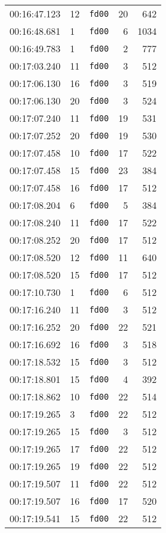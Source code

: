 \documentclass{article}
\begin{document}
\begin{longtable}{lllrr}
00:16:47.123 & 12 & \texttt{fd00} & 20 & 642 \\
00:16:48.681 & 1 & \texttt{fd00} & 6 & 1034 \\
00:16:49.783 & 1 & \texttt{fd00} & 2 & 777 \\
00:17:03.240 & 11 & \texttt{fd00} & 3 & 512 \\
00:17:06.130 & 16 & \texttt{fd00} & 3 & 519 \\
00:17:06.130 & 20 & \texttt{fd00} & 3 & 524 \\
00:17:07.240 & 11 & \texttt{fd00} & 19 & 531 \\
00:17:07.252 & 20 & \texttt{fd00} & 19 & 530 \\
00:17:07.458 & 10 & \texttt{fd00} & 17 & 522 \\
00:17:07.458 & 15 & \texttt{fd00} & 23 & 384 \\
00:17:07.458 & 16 & \texttt{fd00} & 17 & 512 \\
00:17:08.204 & 6 & \texttt{fd00} & 5 & 384 \\
00:17:08.240 & 11 & \texttt{fd00} & 17 & 522 \\
00:17:08.252 & 20 & \texttt{fd00} & 17 & 512 \\
00:17:08.520 & 12 & \texttt{fd00} & 11 & 640 \\
00:17:08.520 & 15 & \texttt{fd00} & 17 & 512 \\
00:17:10.730 & 1 & \texttt{fd00} & 6 & 512 \\
00:17:16.240 & 11 & \texttt{fd00} & 3 & 512 \\
00:17:16.252 & 20 & \texttt{fd00} & 22 & 521 \\
00:17:16.692 & 16 & \texttt{fd00} & 3 & 518 \\
00:17:18.532 & 15 & \texttt{fd00} & 3 & 512 \\
00:17:18.801 & 15 & \texttt{fd00} & 4 & 392 \\
00:17:18.862 & 10 & \texttt{fd00} & 22 & 514 \\
00:17:19.265 & 3 & \texttt{fd00} & 22 & 512 \\
00:17:19.265 & 15 & \texttt{fd00} & 3 & 512 \\
00:17:19.265 & 17 & \texttt{fd00} & 22 & 512 \\
00:17:19.265 & 19 & \texttt{fd00} & 22 & 512 \\
00:17:19.507 & 11 & \texttt{fd00} & 22 & 512 \\
00:17:19.507 & 16 & \texttt{fd00} & 17 & 520 \\
00:17:19.541 & 15 & \texttt{fd00} & 22 & 512 \\

\end{longtable}
\end{document}
